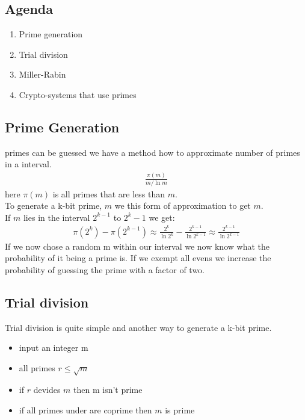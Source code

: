 

\subsection*{Agenda}
\begin{enumerate}
\item Prime generation
\item Trial division
\item Miller-Rabin
\item Crypto-systems that use primes
\end{enumerate}

\subsection{Prime Generation}
primes can be guessed we have a method how to approximate number of primes in a interval.
\begin{align*}
\frac{\pi (m)}{m/\ln m}
\end{align*}
here $\pi (m)$ is all primes that are less than $m$.\\
To generate a k-bit prime, $m$ we this form of approximation to get $m$.\\ If $m$ lies in the interval $2^{k-1}$ to $2^k-1$ we get:
\begin{align*}
\pi (2^k)-\pi (2^{k-1})\approx \frac{2^k}{\ln 2^k}-\frac{2^{k-1}}{\ln 2^{k-1}}\approx \frac{2^{k-1}}{\ln 2^{k-1}}
\end{align*}
If we now chose a random m within our interval we now know what the probability of it being a prime is. If we exempt all evens we increase the probability of guessing the prime with a factor of two.
\subsection{Trial division}
Trial division is quite simple and another way to generate a k-bit prime.
\begin{itemize}
\item input an integer m
\item all primes $r\le \sqrt{m}$
\item if $r$ devides $m$ then m isn't prime
\item if all primes under are coprime then $m$ is prime
\end{itemize}

